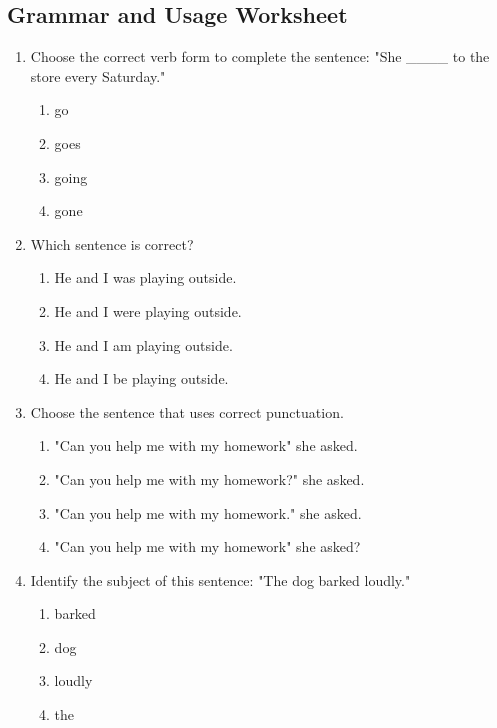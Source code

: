\documentclass[12pt]{article}
\begin{document}
\onehalfspacing

\subsection*{Grammar and Usage Worksheet}

\begin{enumerate}

    \item Choose the correct verb form to complete the sentence:  
    "She \_\_\_\_ to the store every Saturday."  
    \begin{enumerate}[label=\Alph*.]
        \item go
        \item goes
        \item going
        \item gone
    \end{enumerate}
    \vspace{0.5cm}

    \item Which sentence is correct?  
    \begin{enumerate}[label=\Alph*.]
        \item He and I was playing outside.
        \item He and I were playing outside.
        \item He and I am playing outside.
        \item He and I be playing outside.
    \end{enumerate}
    \vspace{0.5cm}

    \item Choose the sentence that uses correct punctuation.  
    \begin{enumerate}[label=\Alph*.]
        \item "Can you help me with my homework" she asked.
        \item "Can you help me with my homework?" she asked.
        \item "Can you help me with my homework." she asked.
        \item "Can you help me with my homework" she asked?
    \end{enumerate}
    \vspace{0.5cm}

    \item Identify the subject of this sentence: "The dog barked loudly."  
    \begin{enumerate}[label=\Alph*.]
        \item barked
        \item dog
        \item loudly
        \item the
    \end{enumerate}
    \vspace{4.5cm}


\end{enumerate}
\end{document}
